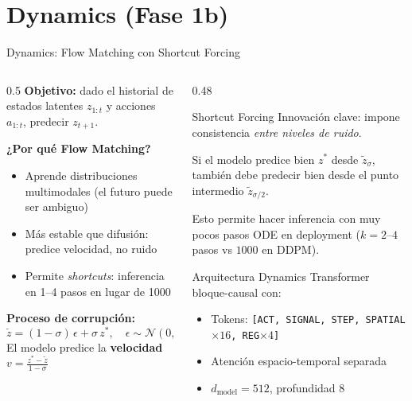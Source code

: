 \documentclass[aspectratio=169, 12pt]{beamer}
\begin{document}
\section{Dynamics (Fase 1b)}

\begin{frame}{Dynamics: Flow Matching con Shortcut Forcing}
\begin{columns}[T]
  \begin{column}{0.5\textwidth}
    \textbf{Objetivo:} dado el historial de estados latentes $z_{1:t}$ y acciones $a_{1:t}$, predecir $z_{t+1}$.

    \vspace{8pt}
    \textbf{¿Por qué Flow Matching?}
    \begin{itemize}
      \item Aprende distribuciones multimodales (el futuro puede ser ambiguo)
      \item Más estable que difusión: predice velocidad, no ruido
      \item Permite \emph{shortcuts}: inferencia en 1--4 pasos en lugar de 1000
    \end{itemize}

    \vspace{8pt}
    \textbf{Proceso de corrupción:}
    \[
      \tilde{z} = (1-\sigma)\,\epsilon + \sigma\, z^* , \quad \epsilon \sim \mathcal{N}(0,I)
    \]
    El modelo predice la \textbf{velocidad} $v = \frac{z^* - \tilde{z}}{1-\sigma}$
  \end{column}
  \begin{column}{0.48\textwidth}
    \begin{alertblock}{Shortcut Forcing}
      Innovación clave: impone consistencia \emph{entre niveles de ruido}.

      \vspace{4pt}
      Si el modelo predice bien $z^*$ desde $\tilde{z}_{\sigma}$, también debe predecir bien desde el punto intermedio $\tilde{z}_{\sigma/2}$.

      \vspace{4pt}
      Esto permite hacer inferencia con muy pocos pasos ODE en deployment ($k{=}2$--$4$ pasos vs $1000$ en DDPM).
    \end{alertblock}
    \vspace{6pt}
    \begin{block}{Arquitectura Dynamics}
      Transformer bloque-causal con:
      \begin{itemize}\small
        \item Tokens: \texttt{[ACT, SIGNAL, STEP, SPATIAL$\times 16$, REG$\times 4$]}
        \item Atención espacio-temporal separada
        \item $d_\text{model}{=}512$, profundidad $8$
      \end{itemize}
    \end{block}
  \end{column}
\end{columns}
\end{frame}
\end{document}
